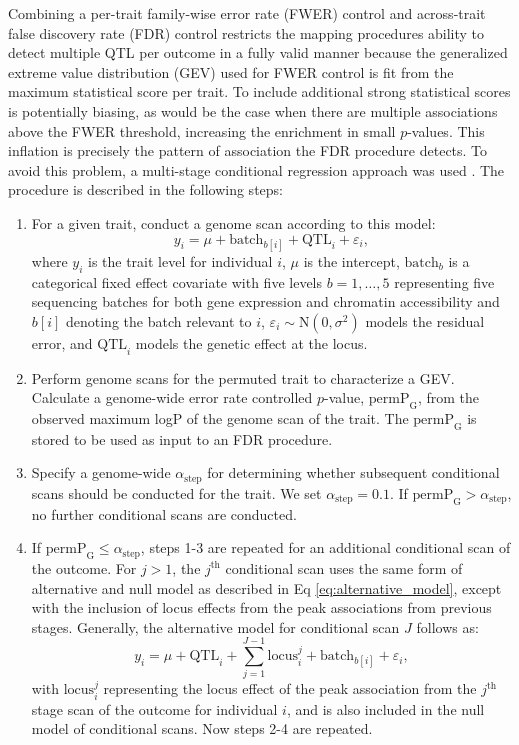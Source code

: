\documentclass[10pt,letterpaper,twoside]{article}
\newcommand{\permpg}{\text{permP}_{\text{G}}}
\begin{document}
Combining a per-trait family-wise error rate (FWER) control and across-trait false discovery rate (FDR) control restricts the mapping procedures ability to detect multiple QTL per outcome in a fully valid manner because the generalized extreme value distribution (GEV) used for FWER control is fit from the maximum statistical score per trait. To include additional strong statistical scores is potentially biasing, as would be the case when there are multiple associations above the FWER threshold, increasing the enrichment in small $p$-values. This inflation is precisely the pattern of association the FDR procedure detects. To avoid this problem, a multi-stage conditional regression approach was used \cite{Jansen2017}. The procedure is described in the following steps:
\begin{enumerate}
    \item For a given trait, conduct a genome scan according to this model: 
\begin{equation}
    y_i = \mu + \text{batch}_{b[i]} + \text{QTL}_i + \varepsilon_i,
      \label{eq:alternative_model}
 \end{equation}
    where $y_{i}$ is the trait level for individual $i$, $\mu$ is the intercept, $\text{batch}_b$ is a categorical fixed effect covariate with five levels $b=1,\dots,5$ representing five sequencing batches for both gene expression and chromatin accessibility and $b[i]$ denoting the batch relevant to $i$, $\varepsilon_i\sim\text{N}(0,\sigma^2)$ models the residual error, and $\text{QTL}_{i}$ models the genetic effect at the locus.
    \item Perform genome scans for the permuted trait to characterize a GEV. Calculate a genome-wide error rate controlled $p$-value, $\permpg$, from the observed maximum logP of the genome scan of the trait. The $\permpg$ is stored to be used as input to an FDR procedure.
    \item Specify a genome-wide $\alpha_{\text{step}}$ for determining whether subsequent conditional scans should be conducted for the trait. We set $\alpha_{\text{step}} = 0.1$. If $\permpg > \alpha_{\text{step}}$, no further conditional scans are conducted.
    \item If $\permpg \le \alpha_{\text{step}}$, steps 1-3 are repeated for an additional conditional scan of the outcome. For $j > 1$, the $j^{\text{th}}$ conditional scan uses the same form of alternative and null model as described in Eq \ref{eq:alternative_model}, except with the inclusion of locus effects from the peak associations from previous stages. Generally, the alternative model for conditional scan $J$ follows as:
\begin{equation}
y_{i} = \mu + \text{QTL}_{i} + \sum_{j=1}^{J-1}\text{locus}_{i}^{j} + \text{batch}_{b[i]} + \varepsilon_{i},
\label{eq:conditional_model}
\end{equation}
with $\text{locus}_{i}^{j}$ representing the locus effect of the peak association from the $j^{\text{th}}$ stage scan of the outcome for individual $i$, and is also included in the null model of conditional scans. Now steps 2-4 are repeated.
\end{enumerate}
\end{document}
